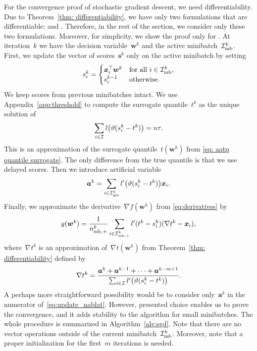 For the convergence proof of stochastic gradient descent, we need differentiability. Due to Theorem~\ref{thm: differentiability}, we have only two formulations that are differentiable: \PatMat and \PatMatNP. Therefore, in the rest of the section, we consider only these two formulations. Moreover, for simplicity, we show the proof only for \PatMat. At iteration~$k$ we have the decision variable~$\bm{w}^k$ and the active minibatch~$\mathcal{I}_{\text{mb}}^k$. First, we update the vector of scores~$\bm{s}^k$ only on the active minibatch by setting
\begin{equation}\label{eq:defin_z}
  s_i^k = \begin{cases}
    \bm{x}_i^\top \bm{w}^k & \text{for all } i \in \mathcal{I}_{\text{mb}}^k, \\
    s_i^{k-1} & \text{otherwise.}
  \end{cases} 
\end{equation}
We keep scores from previous minibatches intact. We use Appendix~\ref{app:threshold} to compute the surrogate quantile~$t^k$ as the unique solution of
\begin{equation}\label{eq:update_t}
  \sum_{i \in \I}l\Brac{\vartheta(s_i^k - t^k)} = n\tau.
\end{equation}
This is an approximation of the surrogate quantile~$t(\bm{w}^k)$ from \eqref{eq: aatp quantile surrogate}. The only difference from the true quantile is that we use delayed scores. Then we introduce artificial variable
\begin{equation}\label{eq:update_a}
  \bm{a}^k = \sum_{i \in \Imb^k} l'\Brac{\vartheta(s_i^k - t^k)}\bm{x}_i.
\end{equation}
Finally, we approximate the derivative~$\nabla f(\bm{w}^k)$ from \eqref{eq:derivatives} by
\begin{equation}\label{eq:update_g}
  g(\bm{w}^k)
    = \frac{1}{n_{\text{mb},+}^k} \sum_{i \in \mathcal{I}_{\text{mb},+}^k} l'(t^k - s_i^k)(\nabla t^k - \bm{x}_i),
\end{equation}
where~$\nabla t^k$ is an approximation of~$\nabla t(\bm{w}^k)$ from Theorem~\ref{thm: differentiability} defined by
\begin{equation}\label{eq:update_nablat}
  \nabla t^k
    = \frac{\bm{a}^k + \bm{a}^{k-1} + \dots + \bm{a}^{k - m + 1}}{\sum_{i \in \I} l'\Brac{\vartheta(s_i^k - t^k)}}.
\end{equation}
A perhaps more straightforward possibility would be to consider only~$\bm{a}^k$ in the numerator of~\eqref{eq:update_nablat}. However, presented choice enables us to prove the convergence, and it adds stability to the algorithm for small minibatches. The whole procedure is summarized in Algorithm~\ref{alg:sgd}. Note that there are no vector operations outside of the current minibatch~$\mathcal{I}_{\text{mb}}^k$. Moreover, note that a proper initialization for the first~$m$ iterations is needed.

